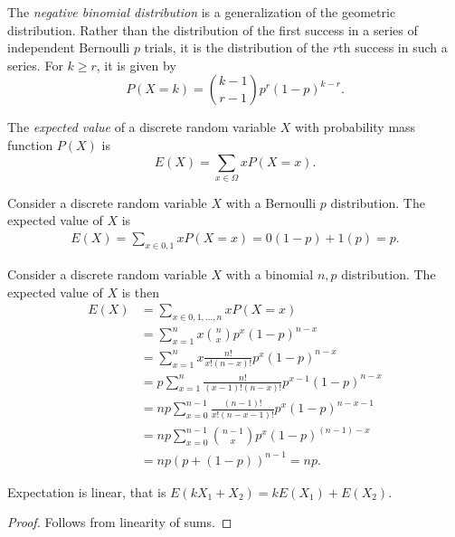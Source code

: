 \begin{defn}
    The \emph{negative binomial distribution} is a generalization of the geometric distribution. Rather than the distribution of the first success in a series of independent Bernoulli $p$ trials, it is the distribution of the $r$th success in such a series. For $k \geq r$, it is given by
    \[P(X = k) = \binom{k-1}{r-1}p^r(1-p)^{k-r}.\]
\end{defn}

\begin{defn}
    The \emph{expected value} of a discrete random variable $X$ with probability mass function $P(X)$ is
    \[E(X) = \sum_{x \in \Omega}xP(X = x).\]
\end{defn}

\begin{exmp}
    Consider a discrete random variable $X$ with a Bernoulli $p$ distribution. The expected value of $X$ is
    \begin{align*}
        E(X) = \sum_{x \in {0, 1}}xP(X = x) = 0(1-p) + 1(p) = p.
    \end{align*}
\end{exmp}

\begin{exmp}
    Consider a discrete random variable $X$ with a binomial $n, p$ distribution. The expected value of $X$ is then
    \begin{align*}
        E(X) &= \sum_{x \in {0, 1, \ldots, n}}xP(X = x) \\
             &= \sum_{x=1}^{n}x\binom{n}{x}p^x(1 - p)^{n-x} \\
             &= \sum_{x=1}^{n}x\frac{n!}{x!(n-x)!}p^x(1 - p)^{n-x} \\
             &= p\sum_{x=1}^{n}\frac{n!}{(x-1)!(n-x)!}p^{x-1}(1 - p)^{n-x} \\
             &= np\sum_{x=0}^{n-1}\frac{(n-1)!}{x!(n-x-1)!}p^x(1 - p)^{n-x-1} \\
             &= np\sum_{x=0}^{n-1}\binom{n-1}{x}p^x(1 - p)^{(n-1)-x} \\
             &= np\left(p+(1-p)\right)^{n-1} = np.
    \end{align*}
\end{exmp}

\begin{prop}
    Expectation is linear, that is $E(kX_1+X_2) = kE(X_1) + E(X_2)$.
\end{prop}

\begin{proof}
    Follows from linearity of sums.
\end{proof}

